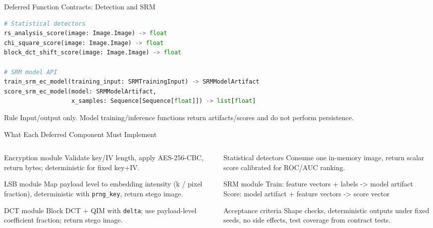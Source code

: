 \documentclass[aspectratio=169,11pt]{beamer}
\begin{document}
\begin{frame}[fragile]{Deferred Function Contracts: Detection and SRM}
\tiny
\begin{lstlisting}[language=Python]
# Statistical detectors
rs_analysis_score(image: Image.Image) -> float
chi_square_score(image: Image.Image) -> float
block_dct_shift_score(image: Image.Image) -> float

# SRM model API
train_srm_ec_model(training_input: SRMTrainingInput) -> SRMModelArtifact
score_srm_ec_model(model: SRMModelArtifact,
                   x_samples: Sequence[Sequence[float]]) -> list[float]
\end{lstlisting}
\begin{alertblock}{Rule}
{\scriptsize Input/output only. Model training/inference functions return artifacts/scores and do not perform persistence.}
\end{alertblock}
\end{frame}

\begin{frame}{What Each Deferred Component Must Implement}
\small
\begin{columns}[T]
\begin{column}{0.48\textwidth}
\begin{block}{Encryption module}
\scriptsize
Validate key/IV length, apply AES-256-CBC, return bytes; deterministic for fixed key+IV.
\end{block}
\begin{block}{LSB module}
\scriptsize
Map payload level to embedding intensity (k / pixel fraction), deterministic with \texttt{prng\_key}, return stego image.
\end{block}
\begin{block}{DCT module}
\scriptsize
Block DCT + QIM with \texttt{delta}; use payload-level coefficient fraction; return stego image.
\end{block}
\end{column}
\begin{column}{0.48\textwidth}
\begin{block}{Statistical detectors}
\scriptsize
Consume one in-memory image, return scalar score calibrated for ROC/AUC ranking.
\end{block}
\begin{block}{SRM module}
\scriptsize
Train: feature vectors + labels -> model artifact\\
Score: model artifact + feature vectors -> score vector
\end{block}
\begin{exampleblock}{Acceptance criteria}
\scriptsize
Shape checks, deterministic outputs under fixed seeds, no side effects, test coverage from contract tests.
\end{exampleblock}
\end{column}
\end{columns}
\end{frame}
\end{document}
